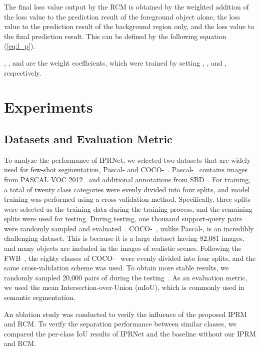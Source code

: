 \documentclass[runningheads]{llncs}
\begin{document}
The final loss value  output by the RCM is obtained by the weighted addition of the loss value  to the prediction result of the foreground object alone, the loss value  to the prediction result of the background region only, and the loss value  to the final prediction result. This can be defined by the following equation (\ref{eq:l_p}).

, , and  are the weight coefficients, which were trained by setting , , and , respectively.
\section{Experiments}
\subsection{Datasets and Evaluation Metric}
To analyze the performance of IPRNet, we selected two datasets that are widely used for few-shot segmentation, Pascal-\cite{Oneshot} and COCO-~\cite{coco}.
Pascal-~\cite{Oneshot} contains images from PASCAL VOC 2012~\cite{pascal} and additional annotations from SBD~\cite{SBD}.
For training, a total of twenty class categories were evenly divided into four splits, and model training was performed using a cross-validation method.
Specifically, three splits were selected as the training data during the training process, and the remaining splits were used for testing.
During testing, one thousand support-query pairs were randomly sampled and evaluated~\cite{Oneshot}.
COCO-~\cite{coco}, unlike Pascal-\cite{Oneshot}, is an incredibly challenging dataset. This is because it is a large dataset having 82,081 images, and many objects are included in the images of realistic scenes.
Following the FWB~\cite{FWB}, the eighty classes of COCO-~\cite{coco} were evenly divided into four splits, and the same cross-validation scheme was used. To obtain more stable results, we randomly sampled 20,000 pairs of during the testing~\cite{PFENet}.
As an evaluation metric, we used the mean Intersection-over-Union (mIoU), which is commonly used in semantic segmentation.

An ablation study was conducted to verify the influence of the proposed IPRM and RCM. To verify the separation performance between similar classes, we compared the per-class IoU results of IPRNet and the baseline without our IPRM and RCM.
\end{document}
